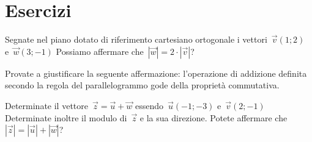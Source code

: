 
\section{Esercizi}

% 


\begin{esercizio}
\label{ese:vett.1}
Segnate nel piano dotato di riferimento cartesiano ortogonale i 
vettori~$\vec{v}(1;2)$ e~$\vec{w}(3;-1)$ Possiamo affermare che~$|\vec{w}|=2 
\cdot |\vec{v}|$?
\end{esercizio}

\begin{esercizio}
\label{ese:vett.2}
Provate a giustificare la seguente affermazione: l'operazione di addizione 
definita secondo la regola del parallelogrammo gode della proprietà commutativa.
\end{esercizio}

\begin{esercizio}
\label{ese:vett.3}
Determinate il vettore~$\vec{z}=\vec{u}+\vec{w}$ essendo~$\vec{u}(-1;-3)$ 
e~$\vec{v}(2;-1)$ Determinate inoltre il modulo di~$\vec{z}$ e la sua direzione.
Potete affermare che~$|\vec{z}|=|\vec{u}|+|\vec{w}|$?
\end{esercizio}

